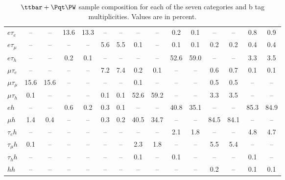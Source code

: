 \begin{sidewaystable}[]
\begin{tabular}{l|cc|cc|cc|cc|cc|cc|cc}
    $e\tau_{e}$            & --   & --       & 13.6 & 13.3     & --   & --       & --   & --       & 0.2  & 0.1      & --   & --       & 0.8  & 0.9      \\
    $e\tau_{\mu}$          & --   & --       & --   & --       & 5.6  & 5.5      & 0.1  & --       & 0.1  & 0.1      & 0.2  & 0.2      & 0.4  & 0.4      \\
    $e\tau_{h}$            & --   & --       & 0.2  & 0.1      & --   & --       & --   & --       & 52.6 & 59.0     & --   & --       & 3.3  & 3.5      \\
    $\mu\tau_{e}$          & --   & --       & --   & --       & 7.2  & 7.4      & 0.2  & 0.1      & --   & --       & 0.6  & 0.7      & 0.1  & 0.1      \\
    $\mu\tau_{\mu}$        & 15.6 & 15.6     & --   & --       & --   & --       & 0.1  & --       & --   & --       & 0.5  & 0.5      & --   & --       \\
    $\mu\tau_{h}$          & 0.1  & --       & --   & --       & 0.1  & 0.1      & 52.6 & 59.2     & --   & --       & 3.3  & 3.5      & --   & --       \\
    $eh$                   & --   & --       & 0.6  & 0.2      & 0.3  & 0.1      & --   & --       & 40.8 & 35.1     & --   & --       & 85.3 & 84.9     \\
    $\mu h$                & 1.4  & 0.4      & --   & --       & 0.3  & 0.2      & 40.5 & 34.7     & --   & --       & 84.5 & 84.1     & --   & --       \\
    $\tau_{e}h$            & --   & --       & --   & --       & --   & --       & --   & --       & 2.1  & 1.8      & --   & --       & 4.8  & 4.7      \\
    $\tau_{\mu}h$          & 0.1  & --       & --   & --       & --   & --       & 2.3  & 1.8      & --   & --       & 5.5  & 5.4      & --   & --       \\
    $\tau_{h}h$            & --   & --       & --   & --       & --   & --       & 0.1  & --       & 0.1  & --       & --   & --       & 0.1  & --       \\
    $hh$                   & --   & --       & --   & --       & --   & --       & --   & --       & --   & --       & 0.2  & --       & 0.1  & 0.1      \\
    \end{tabular}
    \caption{$\ttbar+\Pqt\PW$ sample composition for each of the
    seven categories and b tag multiplicities.  Values are in
    percent.\label{tab:signal_breakdown}}
\end{sidewaystable}
